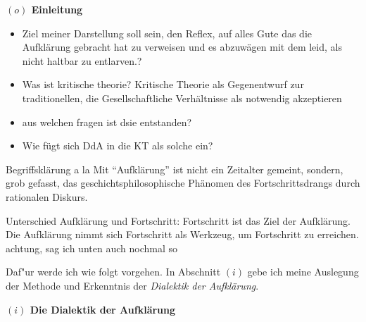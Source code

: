 \documentclass[a4paper, 12pt]{article}
\begin{document}
\begin{onehalfspace} 

\noindent\textbf{$(o)$ Einleitung}

\noindent %

\begin{itemize}

\item Ziel meiner Darstellung soll sein, den Reflex, auf alles Gute das die Aufklärung gebracht hat zu verweisen und es abzuwägen mit dem leid, als nicht haltbar zu entlarven.?
   \item Was ist kritische theorie? Kritische Theorie als Gegenentwurf zur traditionellen, die Gesellschaftliche Verhältnisse als notwendig akzeptieren
  \item aus welchen fragen ist dsie entstanden?
  \item Wie fügt sich DdA in die KT als solche ein?
\end{itemize}

Begriffsklärung a la Mit "`Aufklärung"' ist nicht ein Zeitalter gemeint, sondern, grob gefasst, das geschichtsphilosophische Phänomen des Fortschrittsdrangs durch rationalen Diskurs.

Unterschied Aufklärung und Fortschritt: Fortschritt ist das Ziel der Aufklärung. Die Aufklärung nimmt sich Fortschritt als Werkzeug, um Fortschritt zu erreichen. achtung, sag ich unten auch nochmal so


Daf"ur werde ich wie folgt vorgehen. In Abschnitt $(i)$ gebe ich meine Auslegung der Methode und Erkenntnis der \emph{Dialektik der Aufklärung}. 

\vspace{5mm}


\noindent\textbf{$(i)$ Die Dialektik der Aufklärung}


\end{onehalfspace}
\end{document}
